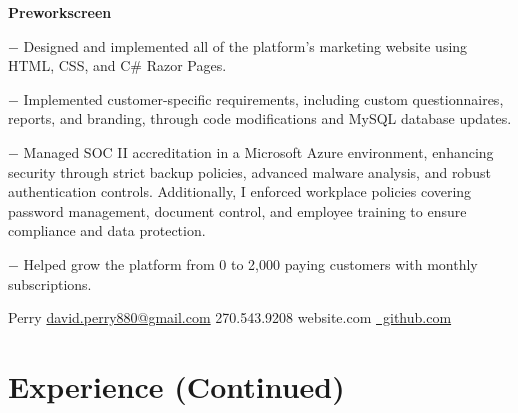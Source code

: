 \documentclass[]{deedy-resume-openfont}
\begin{document}
\begin{minipage}[t]{0.66\textwidth}
\vspace{.15in} %
\begin{tightemize}
\item {\selectfont\bfseries Preworkscreen}
	\vspace{.05in} %
	\begin{tightemize}
		\item[$-$] Designed and implemented all of the platform's marketing website using HTML, CSS, and C\# Razor Pages.
        \item[$-$] Implemented customer-specific requirements, including custom questionnaires, reports, and branding, through code modifications and MySQL database updates.
        \item[$-$] Managed SOC II accreditation in a Microsoft Azure environment, enhancing security through strict backup policies, advanced malware analysis, and robust authentication controls. Additionally, I enforced workplace policies covering password management, document control, and employee training to ensure compliance and data protection.
        \item[$-$] Helped grow the platform from 0 to 2,000 paying customers with monthly subscriptions.
	\end{tightemize}

\vspace{.05in} %
\end{tightemize}
\sectionsep

\end{minipage} 

\newpage


	    {Perry}
	    {\href{mailto:david.perry880@gmail.com}{david.perry880@gmail.com}}
	    {270.543.9208}
	    {website.com}
	    {\href{www.github.com}{\faGithub \  github.com}}
   
\section{Experience (Continued)}
\sectionsep
\end{document}
